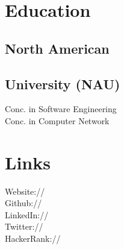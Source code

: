 \documentclass[]{deedy-resume-openfont}
\begin{document}
%
%
\lastupdated


%
%



%
%

\begin{minipage}[t]{0.33\textwidth} 


\section{Education} 

\subsection{North American}
\subsection{University (NAU)}

Conc. in Software Engineering \\
Conc. in Computer Network \\
\sectionsep


\section{Links} 
Website:// \href{http://nadide.github.io/}{} \\
Github:// \href{https://github.com/nadide}{} \\
LinkedIn://  \href{https://www.linkedin.com/in/nadidepasali/}{} \\
Twitter://  \href{https://twitter.com/nadidepasali}{} \\
HackerRank://  \href{https://www.hackerrank.com/nddpasali}{}
\sectionsep


\end{minipage}
\end{document}
